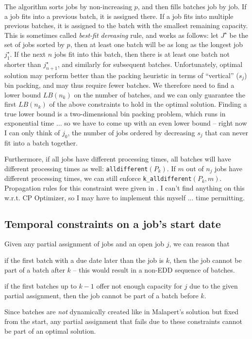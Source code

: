 The algorithm sorts jobs by non-increasing $p$, and then fills batches job by
job. If a job fits into a previous batch, it is assigned there. If a job fits
into multiple previous batches, it is assigned to the batch with the smallest
remaining capacity. This is sometimes called \textit{best-fit dereasing} rule,
and works as follows: let $J^\star$ be the set of jobs sorted by $p$, then at
least one batch will be as long as the longest job $j^\star_1$. If the next $n$
jobs fit into this batch, then there is at least one batch not shorter than
$j^\star_{n+1}$, and similarly for subsequent batches. 
{\color{darkred} 
Unfortunately, optimal solution may perform better than the packing heuristic in
terms of ``vertical'' ($s_j$) bin packing, and may thus require fewer batches.
We therefore need to find a lower bound $LB(n_k)$ on the number of batches, and
we can only guarantee the first $LB(n_k)$ of the above constraints to hold in
the optimal solution. Finding a true lower bound is a two-dimensional bin
packing problem, which runs in exponential time $\dots$ so we
have to come up with an even lower bound -- right now I can only think of $j_0$,
the number of jobs ordered by decreasing $s_j$ that can never fit into a batch
together.}

Furthermore, if all jobs have different processing times, all batches will have
different processing times as well: \texttt{alldifferent}$(P_k)$. If $m$ out of
$n_j$ jobs have different processing times, we can still enforce
\texttt{k\_alldifferent}$(P_k, m)$.  Propagation rules for this constraint were
given in \cite{Lardeux}.  {\color{darkred} I can't find anything on this w.r.t.
CP Optimizer, so I may have to implement this myself $\dots$ time permitting.} 

\subsection{Temporal constraints on a job's start date} Given any partial
assignment of jobs and an open job $j$, we can reason that \begin{alist}
\item{if the first batch with a due date later than the job is $k$, then the job
cannot be part of a batch after $k$ -- this would result in a non-EDD sequence
of batches.} \item{if the first batches up to $k-1$ offer not enough capacity
for $j$ due to the given partial assignment, then the job cannot be part of a
batch before $k$.} \end{alist} Since batches are \textit{not} dynamically
created like in Malapert's solution but fixed from the start, any partial
assignment that fails due to these constraints cannot be part of an optimal
solution.

